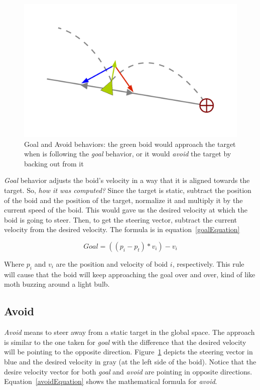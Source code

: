 \begin{figure}[htbp]
\begin{center}
\includegraphics[scale=0.5]{figures/seekANDflee.pdf}
\caption{Goal and Avoid behaviors: the green boid would approach the target when is following the \textit{goal} behavior, or it would \textit{avoid} the target by backing out from it}
\label{seekfleePDF}
\end{center}
\end{figure}

\textit{Goal} behavior adjusts the boid's velocity in a way that it is aligned towards the target. So, \textit{how it was computed?} Since the target is static, subtract the position of the boid and the position of the target, normalize it and multiply it by the current speed of the boid. This would gave us the desired velocity at which the boid is going to steer. Then, to get the steering vector, subtract the current velocity from the desired velocity. The formula is in equation~\ref{goalEquation}

\begin{equation}
\label{goalEquation}
Goal = ((p_i - p_t) * v_i) - v_i
\end{equation}

Where $p_i$ and $v_i$ are the position and velocity of boid $i$, respectively. This rule will cause that the boid will keep approaching the goal over and over, kind of like moth buzzing around a light bulb.

\subsection{Avoid}
\textit{Avoid} means to steer away from a static target in the global space. The approach is similar to the one taken for \textit{goal} with the difference that the desired velocity will be pointing to the opposite direction. Figure~\ref{seekfleePDF} depicts the steering vector in blue and the desired velocity in gray (at the left side of the boid). Notice that the desire velocity vector for both \textit{goal} and \textit{avoid} are pointing in opposite directions. Equation~\ref{avoidEquation} shows the mathematical formula for \textit{avoid}.

